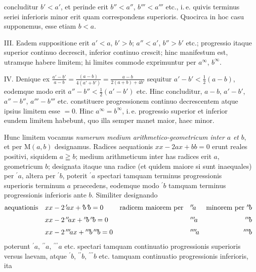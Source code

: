 concluditur $b'<a'$, et perinde erit $b''<a''$, $b'''<a'''$ etc., i.\,e. quivis terminus seriei inferioris minor erit quam correspondens superioris. Quocirca in hoc casu
supponemus, esse etiam $b<a$.
\par
III. Eadem suppositione erit $a'<a$, $b'>b$; $a''<a'$, $b''>b'$ etc.; progressio
itaque superior continuo decrescit, inferior continuo crescit; hinc manifestum est,
utramque habere limitem; hi limites commode exprimuntur per $a^{\infty}$, $b^{\infty}$.
\par
IV. Denique ex $\frac{a'-b'}{a-b}=\frac{(a-b)}{4(a'+b')}=\frac{a-b}{2(a+b)+4b'}$ sequitur $a'-b'<\tfrac12(a-b)$,
eodemque modo erit $a''-b''<\tfrac12(a'-b')$ etc. Hinc concluditur, $a-b$, $a'-b'$,
$a''-b''$, $a'''-b'''$ etc. constituere progressionem continuo decrescentem atque ipsius
limitem esse $=0$. Hinc $a^{\infty}=b^{\infty}$, i.\,e. progressio superior et inferior eundem
limitem habebunt, quo illa semper manet maior, haec minor.
\par
Hunc limitem vocamus \textit{numerum medium arithmetico-geometricum inter $a$ et $b$},
et per $\mathrm{M}(a,b)$ designamus.
Radices aequationis $xx-2ax+bb=0$ erunt reales positivi, siquidem
$a\geqq b$; medium arithmeticum inter has radices erit $a$, geometricum $b$; designata
itaque una radice (et quidem maiore si sunt inaequales) per ${}^{\prime}\!a$, altera per ${}^{\prime}\!b$, poterit ${}^{\prime}\!a$ spectari tamquam terminus progressionis superioris terminum $a$ praecedens, eodemque modo ${}^{\prime}\!b$ tamquam terminus progressionis inferioris ante $b$. Similiter designando
\begingroup\setlength{\arraycolsep}{2pt}
\[
\begin{array}{@{}lllll@{}}
\mathrm{aequationis}&xx-2\,{}^{\prime}\!ax+{}^{\prime}\!b\,{}^{\prime}\!b=0&\mathrm{radicem\ maiorem\ per}&{}^{\prime\prime}\!a&\mathrm{minorem\ per}\ {}^{\prime\prime}\!b\\[6pt]
&xx-2\,{}^{\prime\prime}\!ax+{}^{\prime\prime}\!b\,{}^{\prime\prime}\!b=0&&{}^{\prime\prime\prime}\!a&\hfill{}^{\prime\prime\prime}\!b\\[6pt]
&xx-2\,{}^{\prime\prime\prime}\!ax+{}^{\prime\prime\prime}\!b\,{}^{\prime\prime\prime}\!b=0&&{}^{\prime\prime\prime\prime}\!a&\hfill{}^{\prime\prime\prime\prime}\!b
\end{array}
\]\endgroup
poterunt ${}^{\prime}\!a$, ${}^{\prime\prime}\!a$, ${}^{\prime\prime\prime}\!a$ etc. spectari tamquam continuatio progressionis superioris versus laevam, atque ${}^{\prime}\!b$, ${}^{\prime\prime}\!b$, ${}^{\prime\prime\prime}\!b$ etc. tamquam continuatio progressionis inferioris, ita
